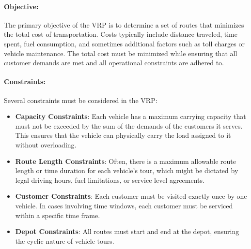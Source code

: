 \documentclass[
]{article}
\begin{document}
    \paragraph{Objective:}
    The primary objective of the VRP is to determine a set of routes that minimizes the total cost of transportation. Costs typically include distance traveled, time spent, fuel consumption, and sometimes additional factors such as toll charges or vehicle maintenance. The total cost must be minimized while ensuring that all customer demands are met and all operational constraints are adhered to.

    \paragraph{Constraints:}
    Several constraints must be considered in the VRP:
    \begin{itemize}
        \item \textbf{Capacity Constraints}: Each vehicle has a maximum carrying capacity that must not be exceeded by the sum of the demands of the customers it serves. This ensures that the vehicle can physically carry the load assigned to it without overloading.
        \item \textbf{Route Length Constraints}: Often, there is a maximum allowable route length or time duration for each vehicle's tour, which might be dictated by legal driving hours, fuel limitations, or service level agreements.
        \item \textbf{Customer Constraints}: Each customer must be visited exactly once by one vehicle. In cases involving time windows, each customer must be serviced within a specific time frame.
        \item \textbf{Depot Constraints}: All routes must start and end at the depot, ensuring the cyclic nature of vehicle tours.
    \end{itemize}

\end{document}
